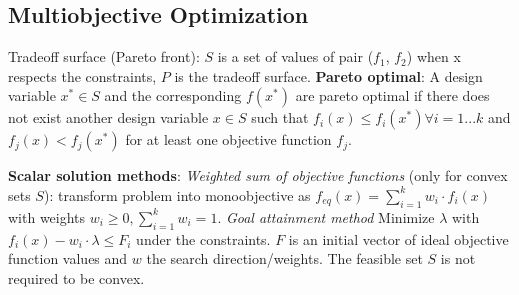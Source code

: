 \subsection*{Multiobjective Optimization}
Tradeoff surface (Pareto front): $S$ is a set of values of pair ($f_1$, $f_2$) when x respects the constraints, $P$ is the tradeoff surface.
\textbf{Pareto optimal}: A design variable $x^* \in S$ and the corresponding $f(x^*)$ are pareto optimal if there does not exist another design variable $x\in S$ such that $f_i (x) \leq f_i (x^*) \forall i = 1 ... k$ and $f_j (x) < f_j (x^*)$ for at least one objective function $f_j$.


\textbf{Scalar solution methods}: 
\textit{Weighted sum of objective functions} (only for convex sets $S$): transform problem into monoobjective as $f_{eq}(x) = \sum_{i=1}^k w_i \cdot f_i(x)$ with weights $w_i \geq 0, \sum_{i=1}^k w_i = 1$. 
\textit{Goal attainment method} 
Minimize $\lambda$ with $f_i (x) - w_i \cdot \lambda \leq F_i$ under the constraints. 
$F$ is an initial vector of ideal objective function values and $w$ the search direction/weights. 
The feasible set $S$ is not required to be convex.

